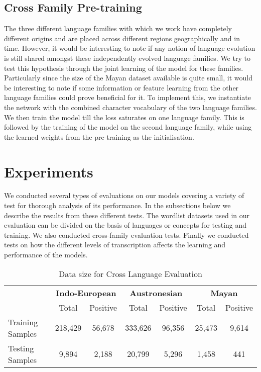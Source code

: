 \documentclass[11pt,letterpaper]{article}
\begin{document}
\subsection{Cross Family Pre-training}

The three different language families with which we work have completely different origins and are placed across different regions geographically and in time. However, it would be interesting to note if any notion of language evolution is still shared amongst these independently evolved language families. We try to test this hypothesis through the joint learning of the model for these families. Particularly since the size of the Mayan dataset available is quite small, it would be interesting to note if some information or feature learning from the other language families could prove beneficial for it. To implement this, we instantiate the network with the combined character vocabulary of the two language families. We then train the model till the loss saturates on one language family. This is followed by the training of the model on the second language family, while using the learned weights from the pre-training as the initialisation. 

\section{Experiments}

We conducted several types of evaluations on our models covering a variety of test for thorough analysis of its performance. In the subsections below we describe the results from these different tests.
The wordlist datasets used in our evaluation can be divided on the basis of languages or concepts for testing and training. We also conducted cross-family evaluation tests. Finally we conducted tests on how the different levels of transcription affects the learning and performance of the models.

\begin{table*}[t]
\centering
\begin{tabular}{lcccccc}
\multicolumn{1}{c}{\textbf{}} & \multicolumn{2}{c}{\textbf{Indo-European}} & \multicolumn{2}{c}{\textbf{Austronesian}} & \multicolumn{2}{c}{\textbf{Mayan}} \\
\multicolumn{1}{c}{}          & Total               & Positive             & Total               & Positive            & Total           & Positive         \\
Training Samples              & 218,429             & 56,678               & 333,626             & 96,356              & 25,473          & 9,614            \\
Testing Samples               & 9,894               & 2,188                & 20,799              & 5,296               & 1,458           & 441             
\end{tabular}
\caption{Data size for Cross Language Evaluation}
\label{CL_count}
\end{table*}
\end{document}
